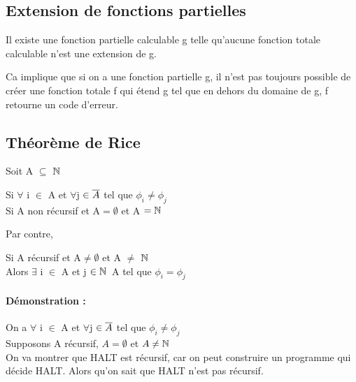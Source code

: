 
\subsection{Extension de fonctions partielles}
\label{sub:extension_de_fonctions_partielles}

\begin{mytheo}
	Il existe une fonction partielle calculable g telle 
	qu'aucune fonction totale calculable n'est une extension de g.
\end{mytheo}

\begin{myrem}
	Ca implique que si on a une fonction partielle g, il n'est pas 
	toujours possible de créer une fonction totale f qui étend g
	tel que en dehors du domaine de g, f retourne un code d'erreur.
\end{myrem}
	

\subsection{Théorème de Rice}
\label{sub:th_or_me_de_rice}

Soit A $\subseteq$ $\mathbb{N}$ \\

\begin{mytheo}[Rice]
	Si $\forall$ i $\in$ A et $\forall$j $\in \overline{A}$ tel que $\phi_i \neq 
	\phi_j$ \\
	Si A non récursif et A$=\emptyset$ et A $= \mathbb{N}$
\end{mytheo}

Par contre,

\begin{mytheo}
	Si A récursif et A$\neq \emptyset$ et A $\neq$ $\mathbb{N}$ \\
	Alors $\exists$ i $\in$ A et j $\in \mathbb{N}$\ A tel que $\phi _i = \phi _j$
\end{mytheo}

\paragraph{Démonstration : }
On a $\forall$ i $\in$ A et $\forall$j $\in \overline{A}$ tel que $\phi_i \neq
\phi_j$\\
Supposons A récursif, $A=\emptyset$ et $A\neq \mathbb{N}$\\
On va montrer que HALT est récursif, car on peut construire un programme qui 
décide HALT. Alors qu'on sait que HALT n'est pas récursif.

